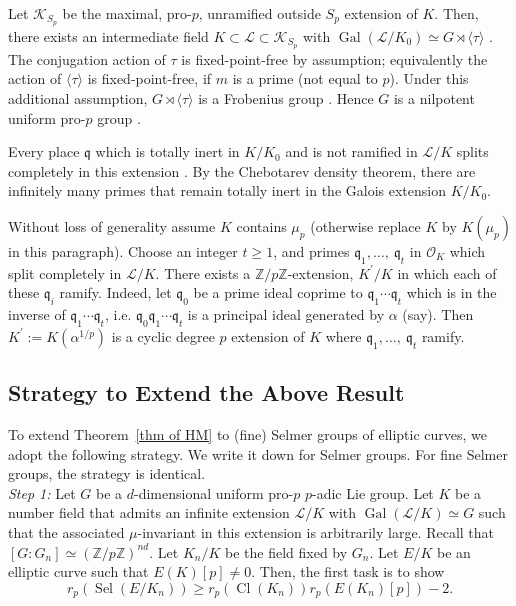 \documentclass{amsart}
\DeclareMathOperator{\Gal}{Gal}
\DeclareMathOperator{\Cl}{Cl}
\DeclareMathOperator{\Sel}{Sel}
\newcommand{\K}{\mathcal K}
\newcommand{\ZZ}{\mathbb Z}
\newcommand{\fq}{\mathfrak q}
\newcommand{\Linf}{\mathcal{L}}
\theoremstyle{definition}
\theoremstyle{remark}
\begin{document}
Let $\K_{S_p}$ be the maximal, pro-$p$, unramified outside $S_p$ extension of $K$.
Then, there exists an intermediate field $K \subset \Linf \subset \K_{S_p}$ with $\Gal(\Linf/K_0)\simeq G \rtimes \langle \tau \rangle$ \cite[Proposition 4.6]{HM19}.
The conjugation action of $\tau$ is fixed-point-free by assumption; equivalently the action of $\langle \tau \rangle$ is fixed-point-free, if $m$ is a prime (not equal to $p$). 
Under this additional assumption, $G \rtimes \langle \tau \rangle$ is a Frobenius group \cite[Theorem 4.6.1(d)]{RZ00}.
Hence $G$ is a nilpotent uniform pro-$p$ group \cite[Corollary 4.6.10]{RZ00}.

Every place $\fq$ which is totally inert in $K/K_0$ and is not ramified in $\Linf/K$ splits completely in this extension \cite[Proposition 4.7]{HM19}.
By the Chebotarev density theorem, there are infinitely many primes that remain totally inert in the Galois extension $K/K_0$.

Without loss of generality assume $K$ contains $\mu_p$ (otherwise replace $K$ by $K(\mu_p)$ in this paragraph).
Choose an integer $t\geq 1$, and primes $\fq_1, \ldots, \ \fq_t$ in $\mathcal{O}_K$ which split completely in $\Linf/K$.
There exists a $\ZZ/p\ZZ$-extension, $K^\prime/K$ in which each of these $\fq_i$ ramify.
Indeed, let $\fq_0$ be a prime ideal coprime to $\fq_1 \cdots \fq_t$ which is in the inverse of $\fq_1 \cdots \fq_t$, i.e. $\fq_0\fq_1 \cdots \fq_t$ is a principal ideal generated by $\alpha$ (say).
Then $K^\prime := K(\alpha^{1/p})$ is a cyclic degree $p$ extension of $K$ where $\fq_1, \ldots, \ \fq_t$ ramify.

\subsection{Strategy to Extend the Above Result}
\label{strategy}
To extend Theorem~\ref{thm of HM} to (fine) Selmer groups of elliptic curves, we adopt the following strategy.
We write it down for Selmer groups.
For fine Selmer groups, the strategy is identical.\\

\noindent \textit{Step 1:}
Let $G$ be a $d$-dimensional uniform pro-$p$ $p$-adic Lie group. 
Let $K$ be a number field that admits an infinite extension $\Linf/K$ with $\Gal(\Linf/K)\simeq G$ such that the associated $\mu$-invariant in this extension is arbitrarily large.
Recall that $[G:G_n]\simeq (\ZZ/p\ZZ)^{nd}$. 
Let $K_n/K$ be the field fixed by $G_n$.
Let $E/K$ be an elliptic curve such that $E(K)[p]\neq 0$.
Then, the first task is to show 
\begin{equation}
\label{inequality from LM15}
r_p \left( \Sel\left( E/K_n\right)\right) \geq r_p \left(\Cl(K_n)\right) r_p\left( E(K_n)[p]\right) - 2.
\end{equation}
\end{document}
